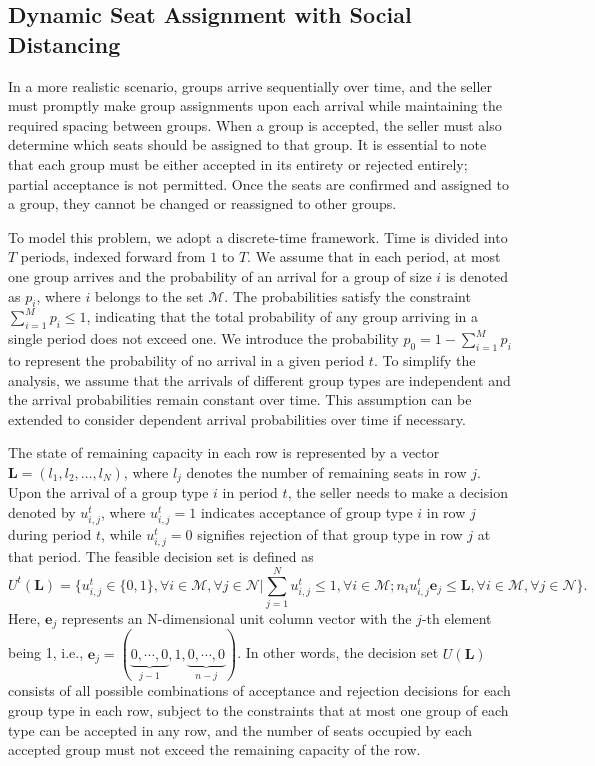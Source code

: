 \subsection{Dynamic Seat Assignment with Social Distancing}\label{sec_dynamic_seat}
In a more realistic scenario, groups arrive sequentially over time, and the seller must promptly make group assignments upon each arrival while maintaining the required spacing between groups. When a group is accepted, the seller must also determine which seats should be assigned to that group. It is essential to note that each group must be either accepted in its entirety or rejected entirely; partial acceptance is not permitted. Once the seats are confirmed and assigned to a group, they cannot be changed or reassigned to other groups.

To model this problem, we adopt a discrete-time framework. Time is divided into $T$ periods, indexed forward from $1$ to $T$. We assume that in each period, at most one group arrives and the probability of an arrival for a group of size $i$ is denoted as $p_i$, where $i$ belongs to the set $\mathcal{M}$. The probabilities satisfy the constraint $\sum_{i=1}^M p_i \leq 1$, indicating that the total probability of any group arriving in a single period does not exceed one. We introduce the probability $p_0 = 1 - \sum_{i=1}^{M} p_i$ to represent the probability of no arrival in a given period $t$. To simplify the analysis, we assume that the arrivals of different group types are independent and the arrival probabilities remain constant over time. This assumption can be extended to consider dependent arrival probabilities over time if necessary.

The state of remaining capacity in each row is represented by a vector $\mathbf{L} = (l_1, l_2, \ldots, l_N)$, where $l_j$ denotes the number of remaining seats in row $j$. Upon the arrival of a group type $i$ in period $t$, the seller needs to make a decision denoted by $u_{i,j}^{t}$, where $u_{i,j}^{t} = 1$ indicates acceptance of group type $i$ in row $j$ during period $t$, while $u_{i,j}^{t} = 0$ signifies rejection of that group type in row $j$ at that period. The feasible decision set is defined as $$U^{t}(\mathbf{L}) = \{u_{i,j}^{t} \in \{0,1\}, \forall i \in \mathcal{M}, \forall j \in \mathcal{N} | \sum_{j=1}^{N} u_{i,j}^{t} \leq 1, \forall i \in \mathcal{M}; n_{i}u_{i,j}^{t}\mathbf{e}_j \leq \mathbf{L}, \forall i \in \mathcal{M}, \forall j \in \mathcal{N}\}.$$ Here, $\mathbf{e}_j$ represents an N-dimensional unit column vector with the $j$-th element being 1, i.e., $\mathbf{e}_j = (\underbrace{0, \cdots, 0}_{j-1}, 1, \underbrace{0, \cdots, 0}_{n-j})$. In other words, the decision set $U(\mathbf{L})$ consists of all possible combinations of acceptance and rejection decisions for each group type in each row, subject to the constraints that at most one group of each type can be accepted in any row, and the number of seats occupied by each accepted group must not exceed the remaining capacity of the row.

